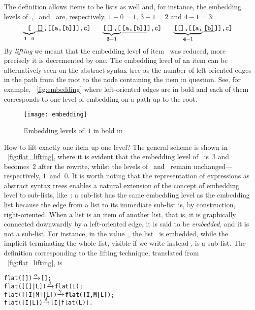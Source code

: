 The definition allows items to be lists as well and, for instance, the
embedding levels of~\erlcode{[]}, \erlcode{[a,[b]]}~and~\erlcode{[b]}
are, respectively, \(1-0=1\), \(3-1=2\) and \(4-1=3\):
\begin{equation*}
\underbrace{\texttt{\textbf{[}}}_{\textbf{1}-0}\texttt{\underline{[]},[[a,[b]]],c]}\quad\;\;
\underbrace{\texttt{\textbf{[[}],\textbf{[}}}_{\textbf{3}-1}\texttt{\underline{[a,[b]]}],c]}\quad\;\;
\underbrace{\texttt{\textbf{[[}],\textbf{[[}a,}}_{\textbf{4}-1}\texttt{\underline{[b]}]],c]}
\end{equation*}
By \emph{lifting} we meant that the embedding level of
item~ was reduced, more precisely it is decremented by
one. The embedding level of an item can be alternatively seen on the
abstract syntax tree as the number of left\hyp{}oriented edges in the
path from the root to the node containing the item in question. See,
for example, \fig~\vref{fig:embedding} where left\hyp{}oriented edges
are in bold and each of them corresponds to one level of embedding on
a path up to the root.
\begin{figure}
\centering
\texttt{[image: embedding]}
\caption{Embedding levels of~\(1\) in bold in
  \label{fig:embedding}}
\end{figure}
How to lift exactly one item up one level? The general scheme is shown
in \fig~\vref{fig:flat_lifting}, where it is evident that the
embedding level of~ is~\(3\) and becomes~\(2\) after the
rewrite, whilst the levels of ~and~ remain
unchanged---respectively, \(1\)~and~\(0\). It is worth noting that the
representation of \Erlang expressions as abstract syntax trees enables
a natural extension of the concept of embedding level to
sub\hyp{}lists, like~: a sub\hyp{}list has the same
embedding level as the embedding list because the edge from a list to
its immediate sub\hyp{}list is, by construction,
right\hyp{}oriented. When a list is an item of another list, that is,
it is graphically connected downwardly by a left\hyp{}oriented edge,
it is said to be \emph{embedded}, and it is not a sub\hyp{}list. For
instance, in the value~\erlcode{[[]]}, the list~\erlcode{[]} is
embedded, while the implicit \erlcode{[]} terminating the whole list,
visible if we write instead \erlcode{[[]|\textbf{[]}]}, is a
sub\hyp{}list. The definition corresponding to the lifting technique,
translated from \fig~\vref{fig:flat_lifting},
is\label{code:flat_lifting}
\begin{alltt}
flat(       []) \(\smashedrightarrow{\alpha}\) [];
flat(   [[]|L]) \(\smashedrightarrow{\beta}\) flat(L);
flat([[I|M]|L]) \(\smashedrightarrow{\gamma}\) \textbf{flat([I,M|L])};\hfill% I \emph{lifted one level up}
flat(    [I|L]) \(\smashedrightarrow{\delta}\) [I|flat(L)].
\end{alltt}

